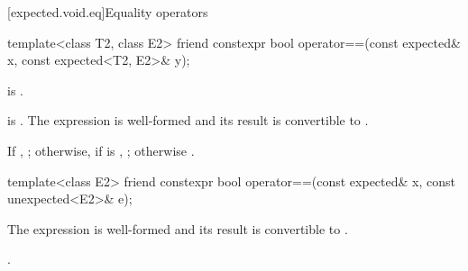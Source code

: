 [expected.void.eq]{Equality operators}

%
\begin{itemdecl}
template<class T2, class E2>
friend constexpr bool operator==(const expected& x, const expected<T2, E2>& y);
\end{itemdecl}

\begin{itemdescr}
\pnum
\constraints
{} is .

\pnum
\mandates
{} is . The expression  is well-formed and its result is convertible to .

\pnum
\returns
If , ; otherwise, if  is , ; otherwise .
\end{itemdescr}

%
\begin{itemdecl}
template<class E2>
friend constexpr bool operator==(const expected& x, const unexpected<E2>& e);
\end{itemdecl}

\begin{itemdescr}
\pnum
\mandates
The expression  is well-formed and its result is convertible to .

\pnum
\returns
{}.
\end{itemdescr}
